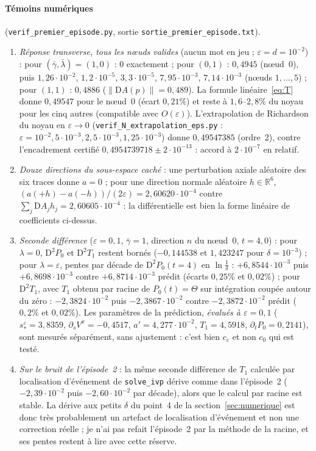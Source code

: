 \documentclass[11pt,a4paper]{article}
\theoremstyle{remark}
\newcommand{\R}{\mathbb R}
\newcommand{\D}{\mathrm D}
\begin{document}
\paragraph{Témoins numériques} (\texttt{verif\_premier\_episode.py}, sortie \texttt{sortie\_premier\_episode.txt}).
\begin{enumerate}[nosep]
\item \emph{Réponse transverse, tous les nœuds valides} (aucun mot en jeu ; $\varepsilon=d=10^{-2}$) : pour $(\bar\gamma,\bar\lambda)=(1,0)$ : $0$ exactement ; pour $(0,1)$ : $0{,}4945$ (nœud~0), puis $1{,}26\cdot10^{-2}$, $1{,}2\cdot10^{-5}$, $3{,}3\cdot10^{-5}$, $7{,}95\cdot10^{-3}$, $7{,}14\cdot10^{-3}$ (nœuds $1,\dots,5$) ; pour $(1,1)$ : $0{,}4886$ ($\lVert\D A(p)\rVert=0{,}489$). La formule linéaire~\eqref{eq:T} donne $0{,}49547$ pour le nœud~0 (écart $0{,}21\%$) et reste à $1{,}6$--$2{,}8\%$ du noyau pour les cinq autres (compatible avec $O(\varepsilon)$). L'extrapolation de Richardson du noyau en $\varepsilon\to0$ (\texttt{verif\_N\_extrapolation\_eps.py} : $\varepsilon=10^{-2},5\cdot10^{-3},2{,}5\cdot10^{-3},1{,}25\cdot10^{-3}$) donne $0{,}49547385$ (ordre~2), contre l'encadrement certifié $0{,}4954739718\pm2\cdot10^{-13}$ : accord à $2\cdot10^{-7}$ en relatif.
\item \emph{Douze directions du sous-espace caché} : une perturbation axiale aléatoire des six traces donne $a=0$ ; pour une direction normale aléatoire $h\in\R^6$, $(a(+h)-a(-h))/(2\varepsilon)=2{,}60620\cdot10^{-4}$ contre $\sum_j\D A_jh_j=2{,}60605\cdot10^{-4}$ : la différentielle est bien la forme linéaire de coefficients ci-dessus.
\item \emph{Seconde différence} ($\varepsilon=0{,}1$, $\bar\gamma=1$, direction $n$ du nœud~0, $t=4{,}0$) : pour $\lambda=0$, $\D^2P_0$ et $\D^2T_1$ restent bornés ($-0{,}144538$ et $1{,}423247$ pour $\delta=10^{-3}$) ; pour $\lambda=\varepsilon$, pentes par décade de $\D^2P_0(t=4)$ en $\ln\frac1\delta$ : $+6{,}8544\cdot10^{-3}$ puis $+6{,}8698\cdot10^{-3}$ contre $+6{,}8714\cdot10^{-3}$ prédit (écarts $0{,}25\%$ et $0{,}02\%$) ; pour $\D^2T_1$, avec $T_1$ obtenu par racine de $P_0(t)=\Theta$ sur intégration coupée autour du zéro : $-2{,}3824\cdot10^{-2}$ puis $-2{,}3867\cdot10^{-2}$ contre $-2{,}3872\cdot10^{-2}$ prédit ($0{,}2\%$ et $0{,}02\%$). Les paramètres de la prédiction, \emph{évalués à $\varepsilon=0{,}1$} ($s_*^\varepsilon=3{,}8359$, $\partial_sV^x=-0{,}4517$, $a'=4{,}277\cdot10^{-2}$, $T_1=4{,}5918$, $\partial_tP_0=0{,}2141$), sont mesurés séparément, sans ajustement : c'est bien $c_\varepsilon$ et non $c_0$ qui est testé.
\item \emph{Sur le bruit de l'épisode~2} : la même seconde différence de $T_1$ calculée par localisation d'événement de \texttt{solve\_ivp} dérive comme dans l'épisode~2 ($-2{,}39\cdot10^{-2}$ puis $-2{,}60\cdot10^{-2}$ par décade), alors que le calcul par racine est stable. La dérive aux petits $\delta$ du point~4 de la section~\ref{sec:numerique} est donc très probablement un artefact de localisation d'événement et non une correction réelle ; je n'ai pas refait l'épisode~2 par la méthode de la racine, et ses pentes restent à lire avec cette réserve.
\end{enumerate}
\end{document}
